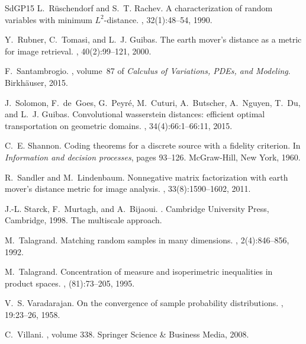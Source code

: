 \documentclass[sts]{imsart}
\begin{document}
\begin{thebibliography}{SdGP{\etalchar{+}}15}
L.~R\"uschendorf and S.~T. Rachev.
\newblock A characterization of random variables with minimum {$L^2$}-distance.
, 32(1):48--54, 1990.

Y.~Rubner, C.~Tomasi, and L.~J. Guibas.
\newblock The earth mover's distance as a metric for image retrieval.
, 40(2):99--121, 2000.

F.~Santambrogio.
, volume~87 of {\em
  Calculus of Variations, {PDE}s, and Modeling}.
\newblock Birkh{\"a}user, 2015.

J.~Solomon, F.~de~Goes, G.~Peyr{\'{e}}, M.~Cuturi, A.~Butscher, A.~Nguyen,
  T.~Du, and L.~J. Guibas.
\newblock Convolutional wasserstein distances: efficient optimal transportation
  on geometric domains.
, 34(4):66:1--66:11, 2015.

C.~E. Shannon.
\newblock Coding theorems for a discrete source with a fidelity criterion.
\newblock In {\em Information and decision processes}, pages 93--126.
  McGraw-Hill, New York, 1960.

R.~Sandler and M.~Lindenbaum.
\newblock Nonnegative matrix factorization with earth mover's distance metric
  for image analysis.
,
  33(8):1590--1602, 2011.

J.-L. Starck, F.~Murtagh, and A.~Bijaoui.
.
\newblock Cambridge University Press, Cambridge, 1998.
\newblock The multiscale approach.

M.~Talagrand.
\newblock Matching random samples in many dimensions.
, 2(4):846--856, 1992.

M.~Talagrand.
\newblock Concentration of measure and isoperimetric inequalities in product
  spaces.
, (81):73--205, 1995.

V.~S. Varadarajan.
\newblock On the convergence of sample probability distributions.
, 19:23--26, 1958.

C.~Villani.
, volume 338.
\newblock Springer Science \& Business Media, 2008.


\end{thebibliography}
\end{document}
